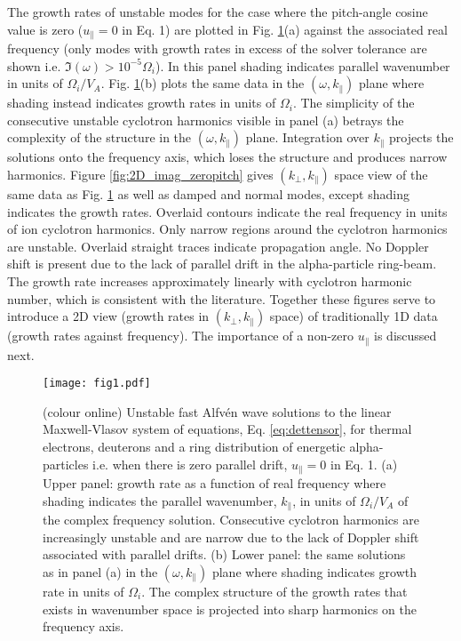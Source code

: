 \documentclass[12pt]{iopart}
\begin{document}
The growth rates of unstable modes for the case where the pitch-angle cosine
value is zero ($u_\parallel = 0$ in Eq. 1) are plotted in Fig.
\ref{fig:2D_F12_zeropitch}(a) against the associated real frequency (only modes
with growth rates in excess of the solver tolerance are shown i.e. $\Im(\omega)
> 10^{-5} \Omega_i$). In this panel shading indicates parallel wavenumber in
units of $\Omega_i/V_A$. Fig. \ref{fig:2D_F12_zeropitch}(b) plots the same data
in the $(\omega,k_\parallel)$ plane where shading instead indicates growth
rates in units of $\Omega_i$.
The simplicity of the consecutive unstable cyclotron harmonics visible in
panel (a) betrays the complexity of the structure in the $(\omega,k_\parallel)$
plane. Integration over $k_\parallel$ projects the solutions onto the frequency
axis, which loses the structure and produces narrow harmonics. Figure
\ref{fig:2D_imag_zeropitch} gives $(k_\perp, k_\parallel)$ space view of the
same data as Fig. \ref{fig:2D_F12_zeropitch} as well as damped and
normal modes, except shading indicates the growth rates. Overlaid
contours indicate the real frequency in units of ion cyclotron harmonics. Only
narrow regions around the cyclotron harmonics are unstable. Overlaid straight
traces indicate propagation angle. No Doppler shift is present due to the lack
of parallel drift in the alpha-particle ring-beam. The growth rate increases
approximately linearly with cyclotron harmonic number, which is consistent with
the literature\cite{Dendy1994}. Together these figures serve to introduce a 2D
view (growth rates in $(k_\perp, k_\parallel)$ space) of traditionally 1D data
(growth rates against frequency). The importance of a non-zero $u_\parallel$ is
discussed next.

\begin{figure}[ht!]
    \raggedleft
\texttt{[image: fig1.pdf]}
    \caption{(colour online) Unstable fast Alfv{\'e}n wave solutions to the
    linear Maxwell-Vlasov system of equations, Eq. \ref{eq:dettensor}, for
    thermal electrons, deuterons and a ring distribution of energetic
    alpha-particles i.e. when there is zero parallel drift, $u_\parallel=0$ in
    Eq. 1. (a) Upper panel: growth rate as a function of real frequency where shading
    indicates the parallel wavenumber, $k_\parallel$, in units of $\Omega_i/V_A$
    of the complex frequency solution. Consecutive cyclotron harmonics are
    increasingly unstable and are narrow due to the lack of Doppler shift 
    associated with parallel drifts. (b) Lower panel: the same solutions
    as in panel (a) in the $(\omega,k_\parallel)$ plane where shading indicates 
    growth rate in units of $\Omega_i$.
    The complex structure of the growth rates that exists in
    wavenumber space is projected into sharp harmonics on the frequency axis.}
    \label{fig:2D_F12_zeropitch}
\end{figure}
\end{document}
